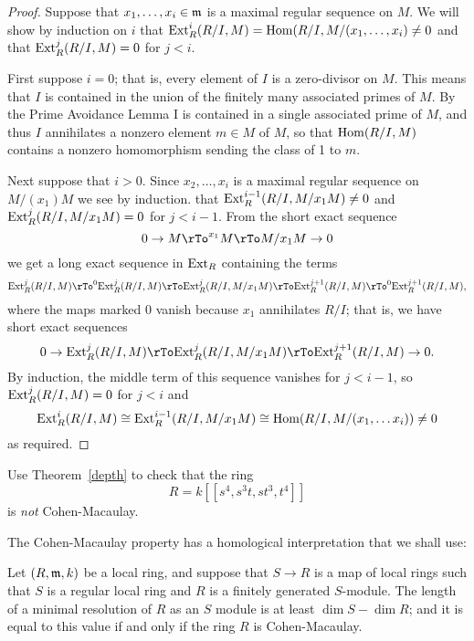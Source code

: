  
\begin{proof} Suppose that $x_{1}, \dots, x_{i}\in \mathfrak m$ is a maximal regular sequence
on $M$. We will show by induction on $i$ that ${\rm{Ext}}^{i}_{R}(R/I, M) = \operatorname{Hom}(R/I,  M/(x_{1}, \dots, x_{i}) \neq 0$ and
that ${\rm{Ext}}^{j}_{R}(R/I,M) = 0$ for $j<i$.

First suppose $i=0$; that is, every element of $I$ is
a zero-divisor on $M$. This means that $I$ is contained in the union of the finitely
many associated primes of $M$. By the Prime Avoidance Lemma \cite[****]{E} I is contained in a single associated prime of $M$, and thus $I$ annihilates a nonzero  element $m\in M$
of $M$, so that $\operatorname{Hom}(R/I,M)$ contains a nonzero homomorphism sending the class of 1 to $m$.

Next suppose that $i>0$. Since $x_{2}, \dots, x_{i}$ is a maximal regular sequence on $M/(x_{1})M$ we see by induction. that ${\rm{Ext}}_R^{i-1}(R/I, M/x_{1}M) \neq 0$ and ${\rm{Ext}}^{j}_{R}(R/I,M/x_{1}M) = 0$ for $j<i-1$. From the short exact sequence
$$
0\to M\rTo^{x_{1}}M \rTo M/x_{1}M \to 0
$$
we get a long exact sequence in ${\rm{Ext}}_R$ containing the terms
$$
\Ext_R^{j}(R/I,M) \rTo^{0} \Ext_R^{j}(R/I,M) \rTo \Ext_R^{j}(R/I,M/x_{1}M) \rTo \Ext_R^{j+1}(R/I,M)\rTo^{0} \Ext_R^{j+1}(R/I,M),
$$
where the maps marked 0 vanish because $x_{1}$ annihilates $R/I$; that is, we have 
short exact sequences
 $$
0\to \Ext_R^{j}(R/I,M) \rTo\Ext_R^{j}(R/I,M/x_{1}M) \rTo \Ext_R^{j+1}(R/I,M)\to 0.
 $$
By induction, the middle term of this sequence vanishes for $j<i-1$, so 
${\rm{Ext}}_R^{j}(R/I,M) = 0$ for $j<i$ and 
$$
{\rm{Ext}}_R^{i}(R/I,M) \cong {\rm{Ext}}_R^{i-1}(R/I,M/x_{1}M) \cong \operatorname{Hom}(R/I, M/(x_{1}, \dots x_{i}))\neq 0
$$
as required.
\end{proof}

\begin{exercise}
 Use Theorem~\ref{depth} to check that the ring
 $$
 R = k[[s^{4}, s^{3}t, st^{3}, t^{4}]]
 $$
is \emph{not} Cohen-Macaulay.
\end{exercise}

The Cohen-Macaulay property has a homological interpretation that we shall use:

\begin{theorem} \label{lower bound for pd}
 Let $(R,\mathfrak m,k)$ be a local ring, and suppose that $S\to R$ is a map of local  rings such that $S$ is a regular local ring and $R$ is a finitely generated $S$-module. The length of a minimal resolution of $R$ as an $S$ module
 is at least $\dim S - \dim R$; and it is equal to this value if and only if the 
 ring $R$ is Cohen-Macaulay.
 \end{theorem}
  

